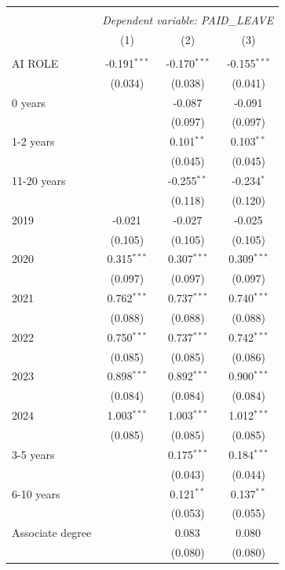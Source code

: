 \begin{table}[!htbp] \centering
\begin{tabular}{@{\extracolsep{5pt}}lccc}
\\[-1.8ex]\hline
\hline \\[-1.8ex]
& \multicolumn{3}{c}{\textit{Dependent variable: PAID_LEAVE}} \
\cr \cline{2-4}
\\[-1.8ex] & (1) & (2) & (3) \\
\hline \\[-1.8ex]
 AI ROLE & -0.191$^{***}$ & -0.170$^{***}$ & -0.155$^{***}$ \\
& (0.034) & (0.038) & (0.041) \\
 0 years & & -0.087$^{}$ & -0.091$^{}$ \\
& & (0.097) & (0.097) \\
 1-2 years & & 0.101$^{**}$ & 0.103$^{**}$ \\
& & (0.045) & (0.045) \\
 11-20 years & & -0.255$^{**}$ & -0.234$^{*}$ \\
& & (0.118) & (0.120) \\
 2019 & -0.021$^{}$ & -0.027$^{}$ & -0.025$^{}$ \\
& (0.105) & (0.105) & (0.105) \\
 2020 & 0.315$^{***}$ & 0.307$^{***}$ & 0.309$^{***}$ \\
& (0.097) & (0.097) & (0.097) \\
 2021 & 0.762$^{***}$ & 0.737$^{***}$ & 0.740$^{***}$ \\
& (0.088) & (0.088) & (0.088) \\
 2022 & 0.750$^{***}$ & 0.737$^{***}$ & 0.742$^{***}$ \\
& (0.085) & (0.085) & (0.086) \\
 2023 & 0.898$^{***}$ & 0.892$^{***}$ & 0.900$^{***}$ \\
& (0.084) & (0.084) & (0.084) \\
 2024 & 1.003$^{***}$ & 1.003$^{***}$ & 1.012$^{***}$ \\
& (0.085) & (0.085) & (0.085) \\
 3-5 years & & 0.175$^{***}$ & 0.184$^{***}$ \\
& & (0.043) & (0.044) \\
 6-10 years & & 0.121$^{**}$ & 0.137$^{**}$ \\
& & (0.053) & (0.055) \\
 Associate degree & & 0.083$^{}$ & 0.080$^{}$ \\
& & (0.080) & (0.080) \\

\end{tabular}
\end{table}
